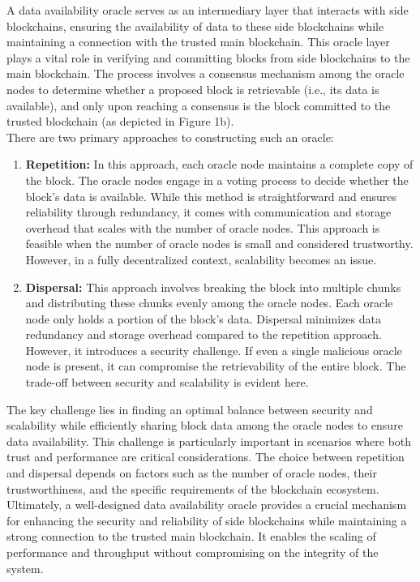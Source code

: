 \documentclass{report}
\begin{document}
A data availability oracle serves as an intermediary layer that interacts with side blockchains, ensuring the availability of data to these side blockchains while maintaining a connection with the trusted main blockchain. This oracle layer plays a vital role in verifying and committing blocks from side blockchains to the main blockchain. The process involves a consensus mechanism among the oracle nodes to determine whether a proposed block is retrievable (i.e., its data is available), and only upon reaching a consensus is the block committed to the trusted blockchain (as depicted in Figure 1b).\\
There are two primary approaches to constructing such an oracle:
\begin{enumerate}
	\item \textbf{Repetition:} In this approach, each oracle node maintains a complete copy of the block. The oracle nodes engage in a voting process to decide whether the block's data is available. While this method is straightforward and ensures reliability through redundancy, it comes with communication and storage overhead that scales with the number of oracle nodes. This approach is feasible when the number of oracle nodes is small and considered trustworthy. However, in a fully decentralized context, scalability becomes an issue.
	\item \textbf{Dispersal:} This approach involves breaking the block into multiple chunks and distributing these chunks evenly among the oracle nodes. Each oracle node only holds a portion of the block's data. Dispersal minimizes data redundancy and storage overhead compared to the repetition approach. However, it introduces a security challenge. If even a single malicious oracle node is present, it can compromise the retrievability of the entire block. The trade-off between security and scalability is evident here.
\end{enumerate}
The key challenge lies in finding an optimal balance between security and scalability while efficiently sharing block data among the oracle nodes to ensure data availability. This challenge is particularly important in scenarios where both trust and performance are critical considerations. The choice between repetition and dispersal depends on factors such as the number of oracle nodes, their trustworthiness, and the specific requirements of the blockchain ecosystem.\\
Ultimately, a well-designed data availability oracle provides a crucial mechanism for enhancing the security and reliability of side blockchains while maintaining a strong connection to the trusted main blockchain. It enables the scaling of performance and throughput without compromising on the integrity of the system.
\end{document}
